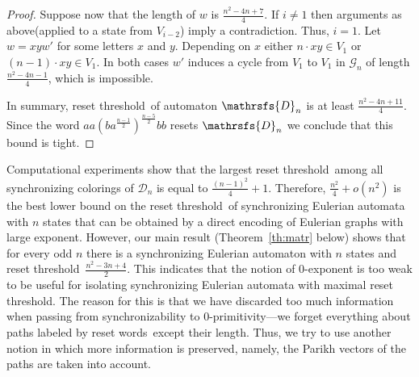 \documentclass[11pt]{llncs}
\newcommand{\sws}{reset words}
\newcommand{\reth}{reset threshold}
\begin{document}
\begin{proof}
Suppose now that the length of $w$ is $\frac{n^2 -4n + 7}{4}$. If $i \neq 1$ then arguments as above(applied to
a state from $V_{i - 2}$) imply a contradiction. Thus, $i = 1$. Let $w = xyw'$ for some letters $x$ and $y$.
Depending on $x$ either $n \cdot xy  \in V_1$ or $(n - 1) \cdot xy \in V_1$. In both cases $w'$ induces a cycle from $V_1$ to $V_1$
in $\mathcal{G}_n$ of length $\frac{n^2 -4n - 1}{4}$, which is impossible.

In summary, \reth\ of automaton $\mathrsfs{D}_n$ is at least $\frac{n^2 -4n + 11}{4}$. Since the word
$aa(ba^{\frac{n - 1}{2}})^\frac{n - 5}{2}bb$ resets $\mathrsfs{D}_n$ we conclude that this bound is tight.

\end{proof}

Computational experiments show that the largest \reth\ among all synchronizing
colorings of $\mathcal{D}_n$ is equal to $\frac{(n - 1)^2}{4} + 1$. Therefore,
$\frac{n^2}{4} + o(n^2)$ is the best lower bound on the \reth\ of synchronizing
Eulerian automata with $n$ states that can be obtained by a direct encoding of
Eulerian graphs with large exponent. However, our main result
(Theorem~\ref{th:matr} below) shows that for every odd $n$ there is a
synchronizing Eulerian automaton with $n$ states and \reth\ $\frac{n^2 -3n +
4}{2}$. This indicates that the notion of 0-exponent is too weak to be useful
for isolating synchronizing Eulerian automata with maximal \reth. The reason
for this is that we have discarded too much information when passing from
synchronizability to 0-primitivity---we forget everything about paths labeled
by \sws\ except their length. Thus, we try to use another notion in which more
information is preserved, namely, the Parikh vectors of the paths are taken
into account.
\end{document}
